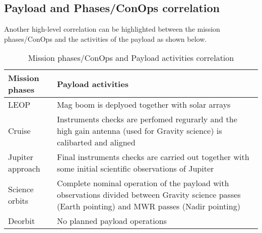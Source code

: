 \subsection{Payload and Phases/ConOps correlation}
Another high-level correlation can be highlighted between the mission phases/ConOps and the activities of the payload as shown below. %


\begin{table}[H]
    \renewcommand{\arraystretch}{1.5}
    \centering
    \begin{tabularx}{\linewidth}{|X|X|}
        \hline
        \textbf{Mission phases} & \textbf{Payload activities} \\
        \hline
        \hline
        LEOP & Mag boom is deplyoed together with solar arrays \\
        \hline
        Cruise & Instruments checks are perfomed regurarly and the high gain antenna (used for Gravity science) is calibarted and aligned \\
        \hline
        Jupiter approach & Final instruments checks are carried out together with some initial scientific observations of Jupiter \\
        \hline
        Science orbits & Complete nominal operation of the payload with observations divided between Gravity science passes (Earth pointing) and MWR passes (Nadir pointing) \\
        \hline
        Deorbit & No planned payload operations \\
        \hline
    \end{tabularx}
    \caption{Mission phases/ConOps and Payload activities correlation}
\end{table}